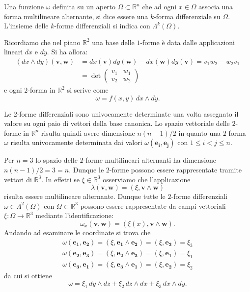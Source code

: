 \documentclass[italian,a4paper]{scrartcl}
\newcommand{\RR}{{\mathbb R}}
\renewcommand{\vec}{\mathbf}
\begin{document}
Una funzione $\omega$ definita su un aperto $\Omega\subset \RR^n$ che
ad ogni $x\in \Omega$ associa una forma multilineare alternante, si
dice essere una $k$-forma differenziale su $\Omega$. L'insieme delle
$k$-forme differenziali si indica con $\Lambda^k(\Omega)$.

\begin{example}
Ricordiamo che nel piano $\RR^2$ una base delle $1$-forme è
data dalle applicazioni lineari $dx$ e $dy$.
Si ha allora:
\begin{align*}
  (dx\wedge dy)(\vec v,\vec w) & =dx(\vec v)dy(\vec w) - dx(\vec w)dy(\vec v) = v_1 w_2 - w_2 v_1\\
&=\det \begin{pmatrix}
v_1 & w_1 \\
v_2 & w_2
\end{pmatrix}
\end{align*}
e ogni $2$-forma in $\RR^2$ si scrive come
\[
\omega = f(x,y)\, dx\wedge dy.
\]
\end{example}


Le $2$-forme differenziali sono univocamente determinate una volta
assegnato il valore su ogni paio di vettori della base
canonica. Lo spazio vettoriale delle $2$-forme in $\RR^n$ risulta
quindi avere dimensione $n(n-1)/2$ in quanto una $2$-forma $\omega$ risulta
univocamente determinata dai valori $\omega(\vec {e_i}, \vec {e_j})$
con $1 \le i < j \le n$.

\begin{example}
Per $n=3$ lo spazio delle $2$-forme multilineari
alternanti ha dimensione
$n(n-1)/2=3=n$. Dunque le $2$-forme possono essere rappresentate
tramite vettori di $\RR^3$. In effetti se $\xi\in \RR^3$ osserviamo
che l'applicazione
\[
  \lambda(\vec v,\vec w) = (\xi, \vec v\wedge \vec w)
\]
risulta essere multilineare alternante. Dunque tutte le $2$-forme
differenziali $\omega \in \Lambda^2(\Omega)$ con $\Omega\subset \RR^3$
possono essere rappresentate da campi vettoriali $\xi\colon \Omega\to
\RR^3$ mediante l'identificazione:
\[
  \omega_x(\vec v, \vec w) = (\xi(x),\vec v \wedge \vec w).
\]
Andando ad esaminare le coordinate si trova che
\begin{align*}
  \omega(\vec{e_1},\vec{e_2}) = (\xi, \vec{e_1}\wedge\vec{e_2}) =
  (\xi,\vec{e_3}) = \xi_3\\
  \omega(\vec{e_2},\vec{e_3}) = (\xi, \vec{e_2}\wedge\vec{e_3}) =
  (\xi,\vec{e_1}) = \xi_1\\
  \omega(\vec{e_3},\vec{e_1}) = (\xi, \vec{e_3}\wedge\vec{e_1}) =
  (\xi,\vec{e_2}) = \xi_2
\end{align*}
da cui si ottiene
\[
 \omega = \xi_1\, dy\wedge dz + \xi_2\, dz\wedge dx + \xi_3\,
 dx\wedge dy.
\]
\end{example}
\end{document}
